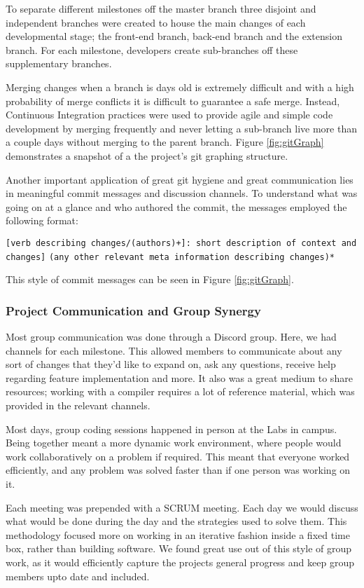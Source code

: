 \documentclass[a4paper,12pt]{article}
\begin{document}
To separate different milestones off the master branch three disjoint and independent branches were created to house the main changes of each developmental stage; the front-end branch, back-end branch and the extension branch. For each milestone, developers create sub-branches off these supplementary branches. 

Merging changes when a branch is days old is extremely difficult and with a high probability of merge conflicts it is difficult to guarantee a safe merge. Instead, Continuous Integration practices were used to provide agile and simple code development by merging frequently and never letting a sub-branch live more than a couple days without merging to the parent branch. Figure \ref{fig:gitGraph} demonstrates a snapshot of a the project's git graphing structure.

Another important application of great git hygiene and great communication lies in meaningful commit messages and discussion channels. To understand what was going on at a glance and who authored the commit, the messages employed the following format:

\verb|[verb describing changes/(authors)+]: short description of context and changes]|
\verb|(any other relevant meta information describing changes)*|

This style of commit messages can be seen in Figure \ref{fig:gitGraph}. 

\subsubsection*{Project Communication and Group Synergy}

Most group communication was done through a Discord group. Here, we had channels for each milestone. This allowed members to communicate about any sort of changes that they'd like to expand on, ask any questions, receive help regarding feature implementation and more. It also was a great medium to share resources; working with a compiler requires a lot of reference material, which was provided in the relevant channels.

Most days, group coding sessions happened in person at the Labs in campus. Being together meant a more dynamic work environment, where people would work collaboratively on a problem if required. This meant that everyone worked efficiently, and any problem was solved faster than if one person was working on it.

Each meeting was prepended with a SCRUM meeting. Each day we would discuss what would be done during the day and the strategies used to solve them. This methodology focused more on working in an iterative fashion inside a fixed time box, rather than building software. We found great use out of this style of group work, as it would efficiently capture the projects general progress and keep group members upto date and included.
\end{document}
